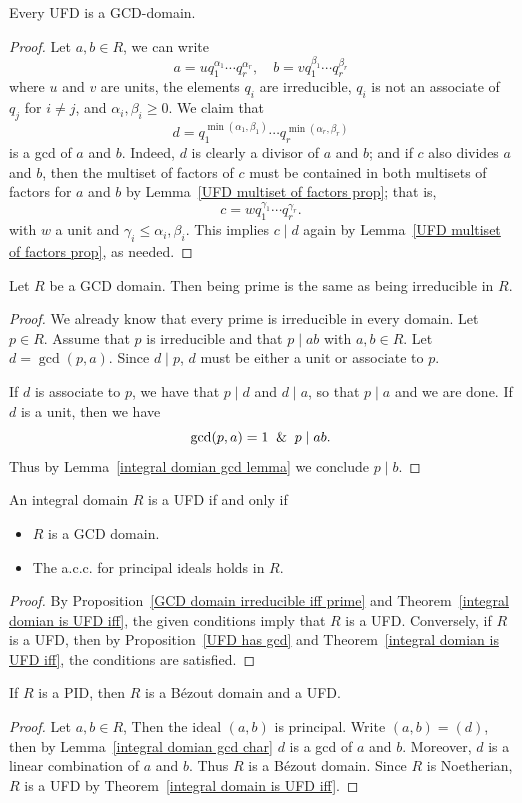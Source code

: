 \begin{proposition}\label{UFD has gcd}
Every UFD is a GCD-domain.
\end{proposition}
\begin{proof}
Let $a,b\in R$, we can write
\[a=uq_1^{\alpha_1}\cdots q_r^{\alpha_r},\quad b=vq_1^{\beta_1}\cdots q_r^{\beta_r}\]
where $u$ and $v$ are units, the elements $q_i$ are irreducible, $q_i$ is not an associate of $q_j$ for $i\neq j$, and $\alpha_i,\beta_i\geq0$. We claim that
\[d=q_1^{\min(\alpha_1,\beta_1)}\cdots q_r^{\min(\alpha_r,\beta_r)}\]
is a gcd of $a$ and $b$. Indeed, $d$ is clearly a divisor of $a$ and $b$; and if $c$ also divides $a$ and $b$, then the multiset of factors of $c$ must be contained in both multisets of factors for $a$ and $b$ by Lemma~\ref{UFD multiset of factors prop}; that is,
\[c=w q_1^{\gamma_1}\cdots q_r^{\gamma_r}.\]
with $w$ a unit and $\gamma_i\leq\alpha_i,\beta_i$. This implies $c\mid d$ again by Lemma~\ref{UFD multiset of factors prop}, as needed.
\end{proof}
\begin{proposition}\label{GCD domain irreducible iff prime}
Let $R$ be a GCD domain. Then being prime is the same as being irreducible in $R$.
\end{proposition}
\begin{proof}
We already know that every prime is irreducible in every domain. Let $p\in R$. Assume that $p$ is irreducible and that $p\mid ab$ with $a,b\in R$. Let $d=\gcd(p,a)$. Since $d\mid p$, $d$ must be either a unit or associate to $p$.\par
If $d$ is associate to $p$, we have that $p\mid d$ and $d\mid a$, so that $p\mid a$ and we are done. If $d$ is a unit, then we have
\[\gcd(p,a)=1\And p\mid ab.\]
Thus by Lemma~\ref{integral domian gcd lemma} we conclude $p\mid b$.
\end{proof}
\begin{theorem}\label{integral domain is UFD iff}
An integral domain $R$ is a UFD if and only if
\begin{itemize}
\item $R$ is a GCD domain.
\item The a.c.c. for principal ideals holds in $R$.
\end{itemize}
\end{theorem}
\begin{proof}
By Proposition~\ref{GCD domain irreducible iff prime} and Theorem~\ref{integral domian is UFD iff}, the given conditions imply that $R$ is a UFD. Conversely, if $R$ is a UFD, then by Proposition~\ref{UFD has gcd} and Theorem~\ref{integral domian is UFD iff}, the conditions are satisfied.
\end{proof}
\begin{theorem}
If $R$ is a PID, then $R$ is a B\'ezout domain and a UFD.
\end{theorem}
\begin{proof}
Let $a,b\in R$, Then the ideal $(a,b)$ is principal. Write $(a,b)=(d)$, then by Lemma~\ref{integral domian gcd char} $d$ is a gcd of $a$ and $b$. Moreover, $d$ is a linear combination of $a$ and $b$. Thus $R$ is a B\'ezout domain. Since $R$ is Noetherian, $R$ is a UFD by Theorem~\ref{integral domain is UFD iff}.
\end{proof}
